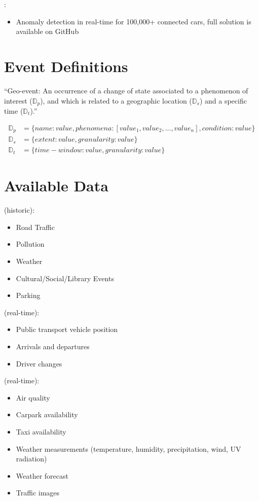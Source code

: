 \documentclass[parskip=half]{scrartcl}
\begin{document}
\cite{Wahner.2019}:
\begin{itemize}
	\item Anomaly detection in real-time for 100,000+ connected cars, full solution is available on GitHub
\end{itemize}


\section{Event Definitions}

\enquote{Geo-event: An occurrence of a change of state associated to a phenomenon of interest ($\mathbb{D}_p$), and which is related to a geographic location ($\mathbb{D}_s$) and a specific time ($\mathbb{D}_t$).}~\cite[p.~3]{Morales.2015}

\begin{align*}
	\mathbb{D}_p &= \{name: value, phenomena: [value_1, value_2, ..., value_n], condition: value\} \\
	\mathbb{D}_s &= \{extent: value, granularity: value\} \\
	\mathbb{D}_t &= \{time-window: value, granularity: value\}
\end{align*}


\section{Available Data}

\cite{CityPulse.2015} (historic):
\begin{itemize}
	\item Road Traffic
	\item Pollution
	\item Weather
	\item Cultural/Social/Library Events
	\item Parking
\end{itemize}

\cite{HelsinkiRegionalTransportAuthority.2020} (real-time):
\begin{itemize}
	\item Public transport vehicle position
	\item Arrivals and departures
	\item Driver changes
\end{itemize}

\cite{data.gov.sg.2020} (real-time):
\begin{itemize}
	\item Air quality
	\item Carpark availability
	\item Taxi availability
	\item Weather measurements (temperature, humidity, precipitation, wind, UV radiation)
	\item Weather forecast
	\item Traffic images
\end{itemize}
\end{document}
